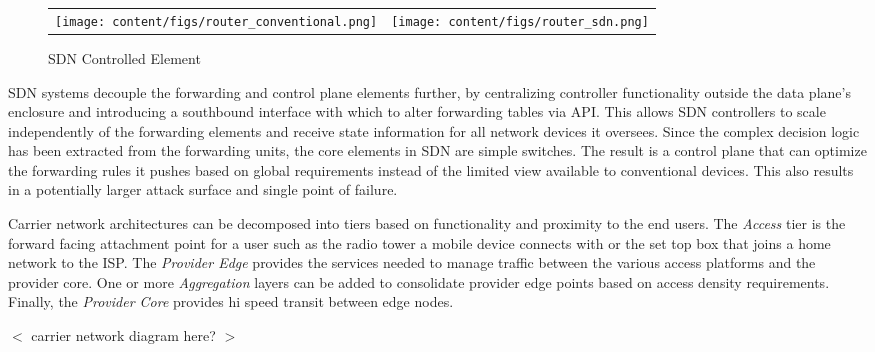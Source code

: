 \begin{figure}[h]
\begin{tabular}{p{}p{}}
\begin{minipage}{.48\textwidth}
\centering
\texttt{[image: content/figs/router\_conventional.png]}
\caption{Conventional Element}
\label{fig:router_conventional}
\end{minipage}
&
\begin{minipage}{.47\textwidth}
\centering
\texttt{[image: content/figs/router\_sdn.png]}
\caption{SDN Controlled Element}
\label{fig:router_sdn}
\end{minipage}
\end{tabular}
\end{figure}

SDN systems decouple the forwarding and control plane elements further, by centralizing controller functionality outside the data plane's enclosure and introducing a southbound interface with which to alter forwarding tables via API. This allows SDN controllers to scale independently of the forwarding elements and receive state information for all network devices it oversees. Since the complex decision logic has been extracted from the forwarding units, the core elements in SDN are simple switches. The result is a control plane that can optimize the forwarding rules it pushes based on global requirements instead of the limited view available to conventional devices. This also results in a potentially larger attack surface and single point of failure. 

Carrier network architectures can be decomposed into tiers based on functionality and proximity to the end users. The \textit{Access} tier is the forward facing attachment point for a user such as the radio tower a mobile device connects with or the set top box that joins a home network to the ISP. The \textit{Provider Edge } provides the services needed to manage traffic between the various access platforms and the provider core. One or more \textit{Aggregation} layers can be added to consolidate provider edge points based on access density requirements. Finally, the \textit{Provider Core} provides hi speed transit between edge nodes. 

$<$ carrier network diagram here? $>$

% 

